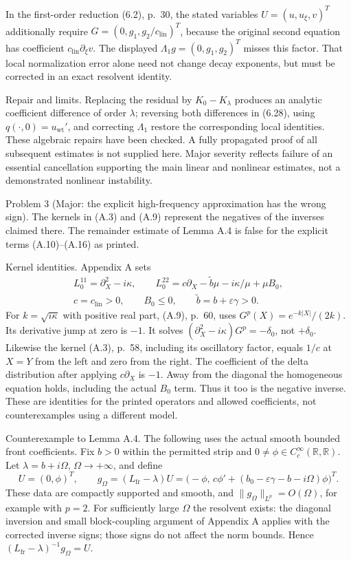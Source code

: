 \documentclass[10pt]{article}
\begin{document}
In the first-order reduction (6.2), p. 30, the stated variables \(U=(u,u_\xi,v)^T\) additionally require \(G=(0,g_1,g_2/c_\mathrm{lin})^T\), because the original second equation has coefficient \(c_\mathrm{lin}\partial_\xi v\). The displayed \(\Lambda_1 g=(0,g_1,g_2)^T\) misses this factor. That local normalization error alone need not change decay exponents, but must be corrected in an exact resolvent identity.\par
Repair and limits. Replacing the residual by \(K_0-K_\lambda\) produces an analytic coefficient difference of order \(\lambda\); reversing both differences in (6.28), using \(q(\cdot,0)=u_\mathrm{wt}'\), and correcting \(\Lambda_1\) restore the corresponding local identities. These algebraic repairs have been checked. A fully propagated proof of all subsequent estimates is not supplied here. Major severity reflects failure of an essential cancellation supporting the main linear and nonlinear estimates, not a demonstrated nonlinear instability.\par
Problem 3 (Major: the explicit high-frequency approximation has the wrong sign).  The kernels in (A.3) and (A.9) represent the negatives of the inverses claimed there. The remainder estimate of Lemma A.4 is false for the explicit terms (A.10)–(A.16) as printed.\par
Kernel identities. Appendix A sets \[\begin{gathered}
 L_0^{11}=\partial_X^2-i\kappa,\qquad
 L_0^{22}=c\partial_X-\widetilde b\mu-i\kappa/\mu+\mu B_0,\\
 c=c_\mathrm{lin}>0,\qquad B_0\le0,\qquad\widetilde b=b+\varepsilon\gamma>0.
 \end{gathered}\] For \(k=\sqrt{i\kappa}\) with positive real part, (A.9), p. 60, uses \(G^p(X)=e^{-k|X|}/(2k)\). Its derivative jump at zero is \(-1\). It solves \((\partial_X^2-i\kappa)G^p=-\delta_0\), not \(+\delta_0\). Likewise the kernel (A.3), p. 58, including its oscillatory factor, equals \(1/c\) at \(X=Y\) from the left and zero from the right. The coefficient of the delta distribution after applying \(c\partial_X\) is \(-1\). Away from the diagonal the homogeneous equation holds, including the actual \(B_0\) term. Thus it too is the negative inverse. These are identities for the printed operators and allowed coefficients, not counterexamples using a different model.\par
Counterexample to Lemma A.4. The following uses the actual smooth bounded front coefficients. Fix \(b>0\) within the permitted strip and \(0\ne\phi\in C_c^\infty(\mathbb R,\mathbb R)\). Let \(\lambda=b+i\Omega\), \(\Omega\to+\infty\), and define \[U=(0,\phi)^T,\qquad
 g_\Omega=(L_\mathrm{fr}-\lambda)U
   =\bigl(-\phi,\,
       c\phi'+(b_0-\varepsilon\gamma-b-i\Omega)\phi\bigr)^T.\] These data are compactly supported and smooth, and \(\|g_\Omega\|_{L^p}=O(\Omega)\), for example with \(p=2\). For sufficiently large \(\Omega\) the resolvent exists: the diagonal inversion and small block-coupling argument of Appendix A applies with the corrected inverse signs; those signs do not affect the norm bounds. Hence \((L_\mathrm{fr}-\lambda)^{-1}g_\Omega=U\).\par
\end{document}
